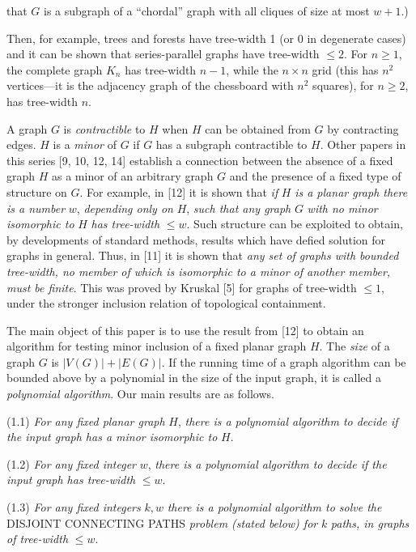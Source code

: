 \noindent that $G$ is a subgraph of a ``chordal'' graph with all cliques of size at most $w + 1$.)

Then, for example, trees and forests have tree-width 1 (or 0 in degenerate cases) and it can be shown that series-parallel graphs have tree-width $\le 2$. For $n \ge 1$, the complete graph $K_n$ has tree-width $n - 1$, while the $n \times n$ grid (this has $n^2$ vertices---it is the adjacency graph of the chessboard with $n^2$ squares), for $n \ge 2$, has tree-width $n$.

A graph $G$ is \textit{contractible} to $H$ when $H$ can be obtained from $G$ by contracting edges. $H$ is a \textit{minor} of $G$ if $G$ has a subgraph contractible to $H$. Other papers in this series [9, 10, 12, 14] establish a connection between the absence of a fixed graph $H$ as a minor of an arbitrary graph $G$ and the presence of a fixed type of structure on $G$. For example, in [12] it is shown that \textit{if} $H$ \textit{is a planar graph there is a number} $w$, \textit{depending only on} $H$, \textit{such that any graph} $G$ \textit{with no minor isomorphic to} $H$ \textit{has tree-width} $\le w$. Such structure can be exploited to obtain, by developments of standard methods, results which have defied solution for graphs in general. Thus, in [11] it is shown that \textit{any set of graphs with bounded tree-width, no member of which is isomorphic to a minor of another member, must be finite}. This was proved by Kruskal [5] for graphs of tree-width $\le 1$, under the stronger inclusion relation of topological containment.

The main object of this paper is to use the result from [12] to obtain an algorithm for testing minor inclusion of a fixed planar graph $H$. The \textit{size} of a graph $G$ is $|V(G)| + |E(G)|$. If the running time of a graph algorithm can be bounded above by a polynomial in the size of the input graph, it is called a \textit{polynomial algorithm}. Our main results are as follows.

\stmt
(1.1) \textit{For any fixed planar graph} $H$, \textit{there is a polynomial algorithm to decide if the input graph has a minor isomorphic to} $H$.

\stmt
(1.2) \textit{For any fixed integer} $w$, \textit{there is a polynomial algorithm to decide if the input graph has tree-width} $\le w$.

\stmt
(1.3) \textit{For any fixed integers} $k, w$ \textit{there is a polynomial algorithm to solve the} DISJOINT CONNECTING PATHS \textit{problem (stated below) for} $k$ \textit{paths, in graphs of tree-width} $\le w$.

